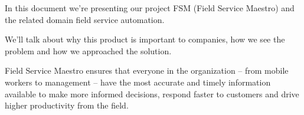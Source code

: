 In this document we're presenting our project FSM (Field Service Maestro) and the related domain field service automation.

We'll talk about why this product is important to companies, how we see the problem and how we approached the solution.

Field Service Maestro ensures that everyone in the organization – from mobile workers to management – have the most accurate and timely information available to make more informed decisions, respond faster to customers and drive higher productivity from the field. 